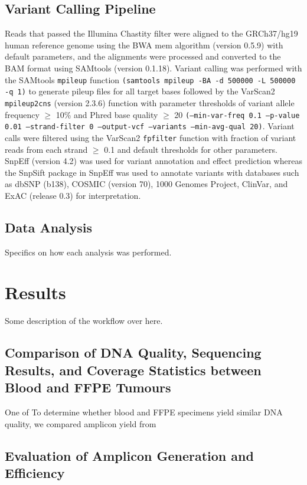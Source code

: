 \documentclass{bmcart}
\begin{document}
\subsection*{Variant Calling Pipeline}
Reads that passed the Illumina Chastity filter were aligned to the GRCh37/hg19 human reference genome using the BWA mem algorithm (version 0.5.9) with default parameters, and the alignments were processed and converted to the BAM format using SAMtools (version 0.1.18). Variant calling was performed with the SAMtools \texttt{mpileup} function \texttt{(samtools mpileup -BA -d 500000 -L 500000 -q 1)} to generate pileup files for all target bases followed by the VarScan2 \texttt{mpileup2cns} (version 2.3.6) function with parameter thresholds of variant allele frequency $\geq$ 10\% and Phred base quality $\geq$ 20 \texttt{(--min-var-freq 0.1 --p-value 0.01 --strand-filter 0 --output-vcf --variants --min-avg-qual 20)}. Variant calls were filtered using the VarScan2 \texttt{fpfilter} function with fraction of variant reads from each strand $\geq$ 0.1 and default thresholds for other parameters. SnpEff (version 4.2) was used for variant annotation and effect prediction whereas the SnpSift package in SnpEff was used to annotate variants with databases such as dbSNP (b138), COSMIC (version 70), 1000 Genomes Project, ClinVar, and ExAC (release 0.3) for interpretation.

\subsection*{Data Analysis}
Specifics on how each analysis was performed.


\section*{Results}
Some description of the workflow over here.

\subsection*{Comparison of DNA Quality, Sequencing Results, and Coverage Statistics between Blood and FFPE Tumours}
One of To determine whether blood and FFPE specimens yield similar DNA quality, we compared amplicon yield from 

\subsection*{Evaluation of Amplicon Generation and Efficiency}
\end{document}
